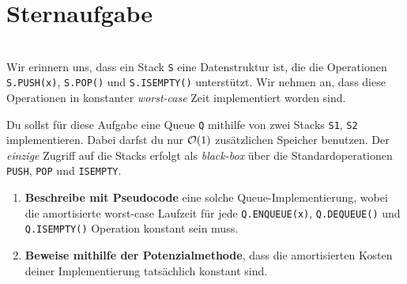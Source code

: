 \documentclass{uebung_cs}
\begin{document}
\section*{Sternaufgabe}

\begin{exercise}\mbox{}\\
	Wir erinnern uns, dass ein Stack \texttt{S} eine Datenstruktur ist, die die Operationen \texttt{S.PUSH(x)}, \texttt{S.POP()} und \texttt{S.ISEMPTY()} unterstützt. Wir nehmen an, dass diese Operationen in konstanter \emph{worst-case} Zeit implementiert worden sind.

	Du sollst für diese Aufgabe eine Queue \texttt{Q} mithilfe von zwei Stacks \texttt{S1}, \texttt{S2} implementieren. Dabei darfst du nur $\mathcal{O}(1)$ zusätzlichen Speicher benutzen.
	Der \textit{einzige} Zugriff auf die Stacks erfolgt als \emph{black-box} über die Standardoperationen \texttt{PUSH}, \texttt{POP} und \texttt{ISEMPTY}.
	\begin{enumerate}
		\item 
		\textbf{Beschreibe mit Pseudocode} eine solche Queue-Implementierung, wobei die amortisierte worst-case Laufzeit für jede \texttt{Q.ENQUEUE(x)}, \texttt{Q.DEQUEUE()} und \texttt{Q.ISEMPTY()} Operation konstant sein muss.
		\item
		\textbf{Beweise mithilfe der Potenzialmethode}, dass die amortisierten Kosten deiner Implementierung tatsächlich konstant sind.
	\end{enumerate}
\end{exercise}
\end{document}
